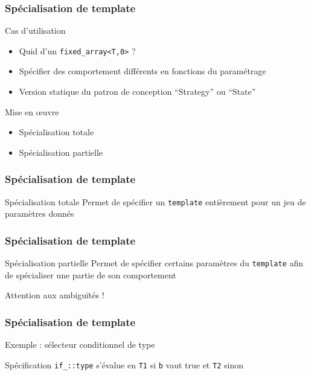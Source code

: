 \documentclass[svgnames]{beamer}
\begin{document}
\frame
{
  \frametitle{Spécialisation de template}
  \begin{block}{Cas d'utilisation}
  \begin{itemize}
  \item Quid d'un \texttt{fixed\_array<T,0>} ?
  \item Spécifier des comportement différents en fonctions du paramétrage
  \item Version statique du patron de conception ``Strategy'' ou ``State''
  \end{itemize}
  \end{block}

  \begin{block}{Mise en œuvre}
  \begin{itemize}
  \item Spécialisation totale
  \item Spécialisation partielle
  \end{itemize}
  \end{block}{}
}

\frame
{
  \frametitle{Spécialisation de template}
  \begin{block}{Spécialisation totale}
  Permet de spécifier un \texttt{template} entièrement pour un jeu de
  paramètres donnés
  \bigskip
  \lstemptypair
  \end{block}
}

\frame
{
  \frametitle{Spécialisation de template}
  \begin{block}{Spécialisation partielle}
  Permet de spécifier certains paramètres du \texttt{template} afin de
  spécialiser une partie de son comportement
  \bigskip
  \lstpartialspec
  \begin{center}\alert{Attention aux ambiguïtés !}\end{center}
  \end{block}
}

\frame
{
  \frametitle{Spécialisation de template}
  \begin{block}{Exemple : sélecteur conditionnel de type}
  \begin{overlayarea}{\textwidth}{5cm}
  {
    \begin{block}{Spécification}
    \texttt{if\_<b,T1,T2>::type} s'évalue en \texttt{T1} si \texttt{b}
    vaut {true} et \texttt{T2} sinon
    \end{block}
  }
  \end{overlayarea}
  \end{block}
}
\end{document}
